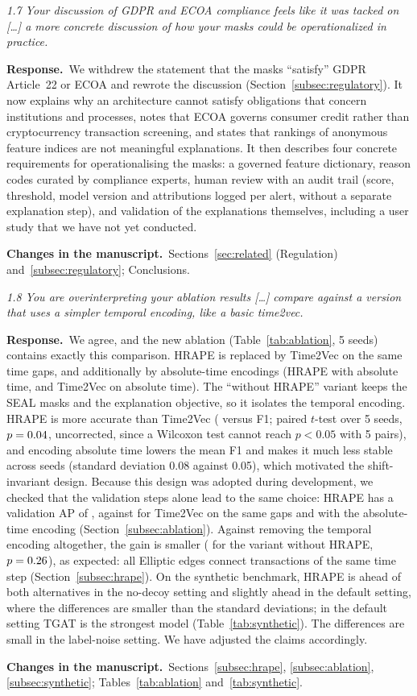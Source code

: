 \documentclass[11pt]{article}
\newenvironment{comment}{\par\medskip\noindent\begin{minipage}{\linewidth}\itshape\color{black!75}}{\end{minipage}\par\smallskip}
\newcommand{\resp}{\par\noindent\textbf{Response.}\ }
\newcommand{\change}{\par\noindent\textbf{Changes in the manuscript.}\ }
\begin{document}
\begin{comment}
1.7 Your discussion of GDPR and ECOA compliance feels like it was tacked on [\dots] a more concrete discussion of how your masks could be operationalized in practice.
\end{comment}
\resp We withdrew the statement that the masks ``satisfy'' GDPR Article~22 or ECOA and rewrote the discussion (Section~\ref{subsec:regulatory}). It now explains why an architecture cannot satisfy obligations that concern institutions and processes, notes that ECOA governs consumer credit rather than cryptocurrency transaction screening, and states that rankings of anonymous feature indices are not meaningful explanations. It then describes four concrete requirements for operationalising the masks: a governed feature dictionary, reason codes curated by compliance experts, human review with an audit trail (score, threshold, model version and attributions logged per alert, without a separate explanation step), and validation of the explanations themselves, including a user study that we have not yet conducted.
\change Sections~\ref{sec:related} (Regulation) and~\ref{subsec:regulatory}; Conclusions.

\begin{comment}
1.8 You are overinterpreting your ablation results [\dots] compare against a version that uses a simpler temporal encoding, like a basic time2vec.
\end{comment}
\resp We agree, and the new ablation (Table~\ref{tab:ablation}, 5 seeds) contains exactly this comparison. HRAPE is replaced by Time2Vec on the same time gaps, and additionally by absolute-time encodings (HRAPE with absolute time, and Time2Vec on absolute time). The ``without HRAPE'' variant keeps the SEAL masks and the explanation objective, so it isolates the temporal encoding. HRAPE is more accurate than Time2Vec (\ablfullFone{} versus \abltimeTwovecFone{} F1; paired $t$-test over 5 seeds, $p=0.04$, uncorrected, since a Wilcoxon test cannot reach $p<0.05$ with 5 pairs), and encoding absolute time lowers the mean F1 and makes it much less stable across seeds (standard deviation 0.08 against 0.05), which motivated the shift-invariant design. Because this design was adopted during development, we checked that the validation steps alone lead to the same choice: HRAPE has a validation AP of \valAPfull{}, against \valAPtimeTwovec{} for Time2Vec on the same gaps and \valAPhrapeabs{} with the absolute-time encoding (Section~\ref{subsec:ablation}). Against removing the temporal encoding altogether, the gain is smaller (\ablnohrapeDelta{} for the variant without HRAPE, $p=0.26$), as expected: all Elliptic edges connect transactions of the same time step (Section~\ref{subsec:hrape}). On the synthetic benchmark, HRAPE is ahead of both alternatives in the no-decoy setting and slightly ahead in the default setting, where the differences are smaller than the standard deviations; in the default setting TGAT is the strongest model (Table~\ref{tab:synthetic}). The differences are small in the label-noise setting. We have adjusted the claims accordingly.
\change Sections~\ref{subsec:hrape}, \ref{subsec:ablation}, \ref{subsec:synthetic}; Tables~\ref{tab:ablation} and~\ref{tab:synthetic}.
\end{document}
